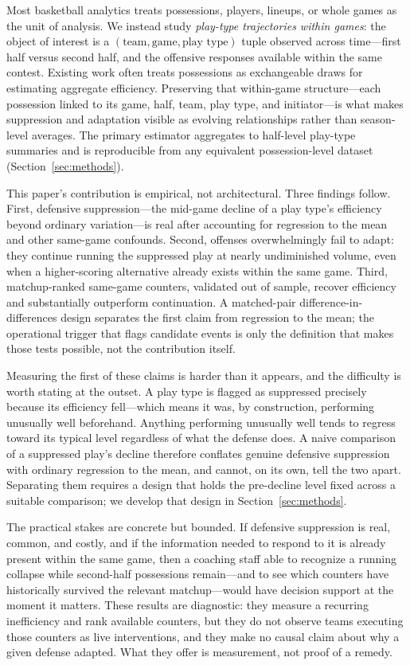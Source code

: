 \documentclass[11pt]{article}
\begin{document}
Most basketball analytics treats possessions, players, lineups, or whole games as the unit of analysis. We instead study \emph{play-type trajectories within games}: the object of interest is a $(\text{team}, \text{game}, \text{play type})$ tuple observed across time---first half versus second half, and the offensive responses available within the same contest. Existing work often treats possessions as exchangeable draws for estimating aggregate efficiency. Preserving that within-game structure---each possession linked to its game, half, team, play type, and initiator---is what makes suppression and adaptation visible as evolving relationships rather than season-level averages. The primary estimator aggregates to half-level play-type summaries and is reproducible from any equivalent possession-level dataset (Section~\ref{sec:methods}).

This paper's contribution is empirical, not architectural. Three findings follow. First, defensive suppression---the mid-game decline of a play type's efficiency beyond ordinary variation---is real after accounting for regression to the mean and other same-game confounds. Second, offenses overwhelmingly fail to adapt: they continue running the suppressed play at nearly undiminished volume, even when a higher-scoring alternative already exists within the same game. Third, matchup-ranked same-game counters, validated out of sample, recover efficiency and substantially outperform continuation. A matched-pair difference-in-differences design separates the first claim from regression to the mean; the operational trigger that flags candidate events is only the definition that makes those tests possible, not the contribution itself.

Measuring the first of these claims is harder than it appears, and the difficulty is worth stating at the outset. A play type is flagged as suppressed precisely because its efficiency fell---which means it was, by construction, performing unusually well beforehand. Anything performing unusually well tends to regress toward its typical level regardless of what the defense does. A naive comparison of a suppressed play's decline therefore conflates genuine defensive suppression with ordinary regression to the mean, and cannot, on its own, tell the two apart. Separating them requires a design that holds the pre-decline level fixed across a suitable comparison; we develop that design in Section~\ref{sec:methods}.

The practical stakes are concrete but bounded. If defensive suppression is real, common, and costly, and if the information needed to respond to it is already present within the same game, then a coaching staff able to recognize a running collapse while second-half possessions remain---and to see which counters have historically survived the relevant matchup---would have decision support at the moment it matters. These results are diagnostic: they measure a recurring inefficiency and rank available counters, but they do not observe teams executing those counters as live interventions, and they make no causal claim about why a given defense adapted. What they offer is measurement, not proof of a remedy.
\end{document}
